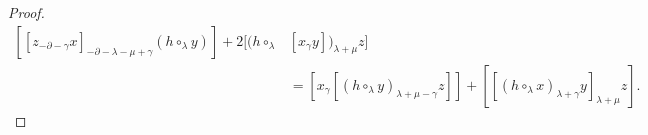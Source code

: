 \documentclass[11pt,letterpaper,reqno]{amsart}
\theoremstyle{definition}
\numberwithin{equation}{section}
\begin{document}
\begin{proof}
\begin{align*}
      [[z_{-\partial-\gamma}x]_{-\partial-\lambda-\mu+\gamma}(h\circ_{\lambda}y)]+2[(h\circ_{\lambda}&[x_{\gamma}y])_{\lambda+\mu}z] \nonumber\\
      &=[x_{\gamma}[(h\circ_{\lambda}y)_{\lambda+\mu-\gamma}z]]+[[(h\circ_{\lambda}x)_{\lambda+\gamma}y]_{\lambda+\mu}z].

\end{align*}
\end{proof}
\end{document}
